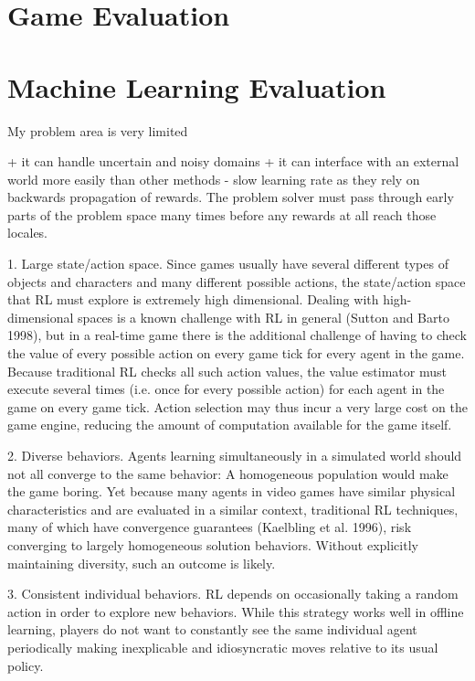 \documentclass[a4paper,oneside]{report}
\begin{document}
\section{Game Evaluation}

\section{Machine Learning Evaluation}

My problem area is very limited

+ it can handle uncertain and noisy domains
+ it can interface with an external world more easily than other methods
- slow learning rate as they rely on backwards propagation of rewards. The problem solver must pass through early parts of the problem space many times before any rewards at all reach those locales.

1. Large state/action space. Since games usually have several different types of objects and characters and many different possible actions, the state/action space that RL must explore is extremely high dimensional. Dealing with high-dimensional spaces is a known challenge with RL in general (Sutton and Barto 1998), but in a real-time game there is the additional challenge of having to check the value of every possible action on every game tick for every agent in the game. Because traditional RL checks all such action values, the value estimator must execute several times (i.e. once for every possible action) for each agent in the game on every game tick. Action selection may thus incur a very large cost on the game engine, reducing the amount of computation available for the game itself.

2. Diverse behaviors. Agents learning simultaneously in a simulated world should not all converge to the same behavior: A homogeneous population would make the game boring. Yet because many agents in video games have similar physical characteristics and are evaluated in a similar context, traditional RL techniques, many of which have convergence guarantees (Kaelbling et al. 1996), risk converging to largely homogeneous solution behaviors. Without explicitly maintaining diversity, such an outcome is likely.

3. Consistent individual behaviors. RL depends on occasionally taking a random action in order to explore new behaviors. While this strategy works well in offline learning, players do not want to constantly see the same individual agent periodically making inexplicable and idiosyncratic moves relative to its usual policy.
\end{document}
